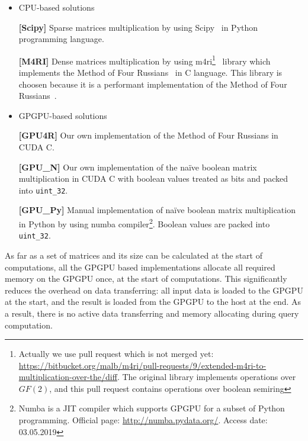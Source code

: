 \begin{itemize}
  \item CPU-based solutions

    \textbf{[Scipy]} Sparse matrices multiplication by using Scipy~\cite{scipy} in Python programming language.

    \textbf{[M4RI]} Dense matrices multiplication by using m4ri\footnote{Actually we use pull request which is not merged yet: \url{https://bitbucket.org/malb/m4ri/pull-requests/9/extended-m4ri-to-multiplication-over-the/diff}. The original library implements operations over $GF(2)$, and this pull request contains operations over boolean semiring}~\cite{M4RI} library which implements the Method of Four Russians~\cite{arlazarov1970economical} in C language.
    This library is choosen because it is a performant implementation of the Method of Four Russians~\cite{albrechtefficient}.
  \item GPGPU-based solutions

    \textbf{[GPU4R]} Our own implementation of the Method of Four Russians in CUDA C.

    \textbf{[GPU\_N]} Our own implementation of the na\"ive boolean matrix multiplication in CUDA C with boolean values treated as bits and packed into \texttt{uint\_32}.

    \textbf{[GPU\_Py]} Manual implementation of na\"ive boolean matrix multiplication in Python by using numba compiler\footnote{Numba is a JIT compiler which supports GPGPU for a subset of Python programming. Official page: \url{http://numba.pydata.org/}. Access date: 03.05.2019}.
    Boolean values are packed into \texttt{uint\_32}.

\end{itemize}

As far as a set of matrices and its size can be calculated at the start of computations, all the GPGPU based implementations allocate all required memory on the GPGPU once, at the start of computations.
This significantly reduces the overhead on data transferring: all input data is loaded to the GPGPU at the start, and the result is loaded from the GPGPU to the host at the end.
As a result, there is no active data transferring and memory allocating during query computation.
